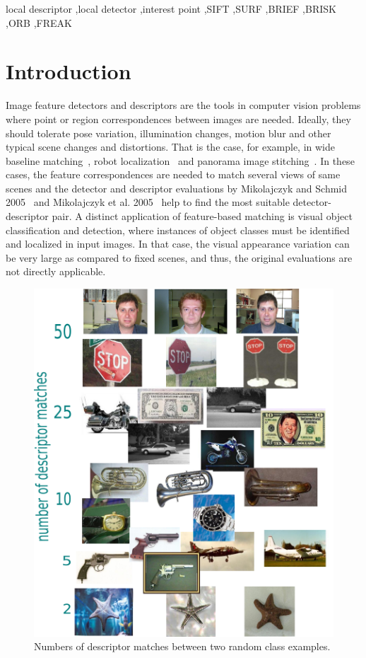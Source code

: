 \documentclass[review]{elsarticle}
\begin{document}
\begin{frontmatter}
\begin{keyword}
local descriptor \sep local detector \sep interest point \sep SIFT \sep SURF \sep BRIEF \sep BRISK \sep ORB \sep FREAK
\end{keyword}



\end{frontmatter}

\linenumbers


%
\section{Introduction}
Image
feature detectors and descriptors are the tools
in computer vision problems where point or region correspondences between images are needed.
Ideally, they should tolerate pose variation, illumination changes,
motion blur and other typical scene changes and distortions. That is
the case, for example, in
wide baseline matching~\cite{TuyGoo:2004}, robot
localization~\cite{SeLowLit:2002} and panorama image
stitching~\cite{BroLow:2003}. In these cases, 
the feature correspondences are needed to match several views of
same scenes and the detector and descriptor
evaluations by Mikolajczyk and Schmid 2005~\cite{MikTuySch:2005} and
Mikolajczyk et al. 2005~\cite{MikSch:2005} help to find the
most suitable detector-descriptor pair. A distinct application of
feature-based matching is visual object classification and
detection, where instances of object classes must be identified
and localized in input images. In that case, the visual appearance
variation can be very large as compared to fixed scenes, and thus,
the original evaluations are not directly applicable.
%
\begin{figure}[h]
\begin{center}
  \includegraphics[width=0.5\linewidth]{resources/number_of_descriptor_matches.pdf}
  \caption{Numbers of descriptor matches between two random class examples.\label{fig:teaser}}
\end{center}
\end{figure}
%
\end{document}
